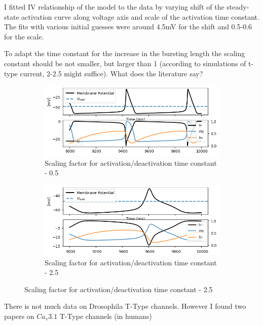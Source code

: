 \documentclass[11pt]{article}
\begin{document}
I fitted IV relationship of the model to the data by varying shift of the
steady-state activation curve along voltage axis and scale of the activation time
constant. The fits with various initial guesses were around 4.5mV for the shift and
0.5-0.6 for the scale.

To adapt the time constant for the increase in the bursting length the scaling
constant should be not smaller, but larger than 1 (according to simulations of t-type
current, 2-2.5 might suffice). What does the literature say?

\begin{figure}[H]
    \centering
    \begin{subfigure}[t]{0.45\textwidth}
        \centering
        \includegraphics[width=\textwidth]{./img/2025_01_15/simulation_0,5.png}
        \caption{Scaling factor for activation/deactivation time constant - 0.5}
    \end{subfigure}
    \hfill
    \begin{subfigure}[t]{0.45\textwidth}
        \centering
        \includegraphics[width=\textwidth]{./img/2025_01_15/simulation_2,5.png}
        \caption{Scaling factor for activation/deactivation time constant - 2.5}
    \end{subfigure}
\end{figure}

There is not much data on Drosophila T-Type channels. However I found two papers
on $Ca_v3.1$ T-Type channels (in humans)
\end{document}
